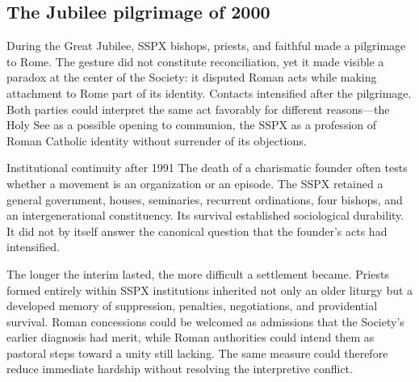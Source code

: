 \subsection{The Jubilee pilgrimage of 2000}

During the Great Jubilee, SSPX bishops, priests, and faithful made a pilgrimage to Rome. The gesture did not constitute reconciliation, yet it made visible a paradox at the center of the Society: it disputed Roman acts while making attachment to Rome part of its identity. Contacts intensified after the pilgrimage. Both parties could interpret the same act favorably for different reasons---the Holy See as a possible opening to communion, the SSPX as a profession of Roman Catholic identity without surrender of its objections.

\begin{studybox}{Institutional continuity after 1991}
The death of a charismatic founder often tests whether a movement is an organization or an episode. The SSPX retained a general government, houses, seminaries, recurrent ordinations, four bishops, and an intergenerational constituency. Its survival established sociological durability. It did not by itself answer the canonical question that the founder's acts had intensified.
\end{studybox}

The longer the interim lasted, the more difficult a settlement became. Priests formed entirely within SSPX institutions inherited not only an older liturgy but a developed memory of suppression, penalties, negotiations, and providential survival. Roman concessions could be welcomed as admissions that the Society's earlier diagnosis had merit, while Roman authorities could intend them as pastoral steps toward a unity still lacking. The same measure could therefore reduce immediate hardship without resolving the interpretive conflict.
